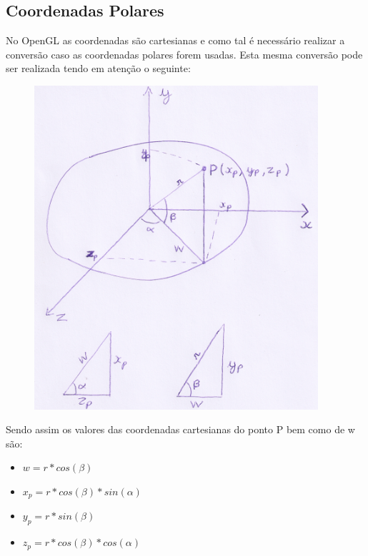 \documentclass{article}
\begin{document}
\subsection{Coordenadas Polares}
\label{PolarCoordinates}
No OpenGL as coordenadas são cartesianas e como tal é necessário realizar a conversão caso as coordenadas polares forem usadas. Esta mesma conversão pode ser realizada tendo em atenção o seguinte:

\begin{figure}[H]
\centering
\includegraphics[height=12cm]{scan.png}
\end{figure}
Sendo assim os valores das coordenadas cartesianas do ponto P bem como de w são:
\begin{itemize}
    \item $w = r * cos(\beta)$
    \item $x_{p} = r * cos(\beta) * sin(\alpha)$
    \item $y_{p} = r * sin(\beta)$
    \item $z_{p} = r * cos(\beta) * cos(\alpha)$
\end{itemize}
\end{document}
